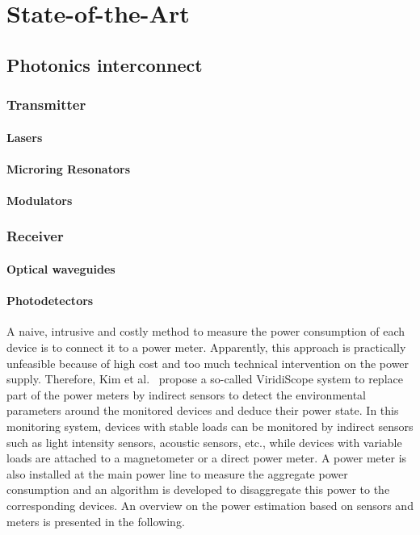 
\chapter{State-of-the-Art} %
\label{SoA}

\section{Photonics interconnect}
\subsection{Transmitter}
\subsubsection{Lasers}
\subsubsection{Microring Resonators}
\subsubsection{Modulators}
\subsection{Receiver}
\subsubsection{Optical waveguides}
\subsubsection{Photodetectors}
A naive, intrusive and costly method to measure the power consumption of each device is to connect it to a  power meter. Apparently, this approach is practically unfeasible because of high cost and too much technical intervention on the power supply. Therefore, Kim et al.~\cite{Kim09Ubicomp} propose a so-called ViridiScope system to replace part of the power meters by indirect sensors to detect the environmental parameters around the monitored devices and deduce their power state. In this monitoring system, devices with stable loads can be monitored by indirect sensors such as light intensity sensors, acoustic sensors, etc., while devices with variable loads are attached to a magnetometer  or a direct power meter. A power meter is also installed at the main power line to measure the aggregate power consumption and an algorithm is developed to disaggregate this power to the corresponding devices.
An overview on the power estimation based on sensors and meters is presented in the following. 

